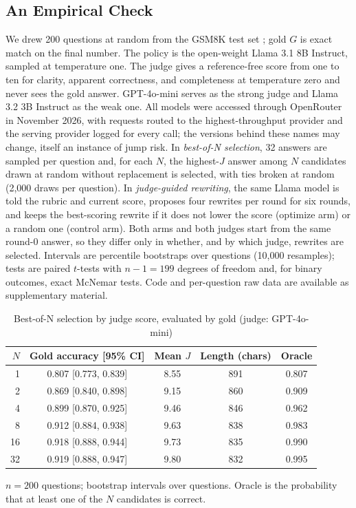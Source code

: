 \documentclass[acmsmall,screen,review,anonymous]{acmart}
\theoremstyle{acmdefinition}
\begin{document}
\subsection{An Empirical Check}

We drew 200 questions at random from the GSM8K test set \citep{cobbe2021}; gold $G$ is exact match on the final number. The policy is the open-weight Llama 3.1 8B Instruct, sampled at temperature one. The judge gives a reference-free score from one to ten for clarity, apparent correctness, and completeness at temperature zero and never sees the gold answer. GPT-4o-mini serves as the strong judge and Llama 3.2 3B Instruct as the weak one. All models were accessed through OpenRouter in November 2026, with requests routed to the highest-throughput provider and the serving provider logged for every call; the versions behind these names may change, itself an instance of jump risk. In \emph{best-of-N selection}, 32 answers are sampled per question and, for each $N$, the highest-$J$ answer among $N$ candidates drawn at random without replacement is selected, with ties broken at random (2,000 draws per question). In \emph{judge-guided rewriting}, the same Llama model is told the rubric and current score, proposes four rewrites per round for six rounds, and keeps the best-scoring rewrite if it does not lower the score (optimize arm) or a random one (control arm). Both arms and both judges start from the same round-0 answer, so they differ only in whether, and by which judge, rewrites are selected. Intervals are percentile bootstraps over questions (10,000 resamples); tests are paired $t$-tests with $n - 1 = 199$ degrees of freedom and, for binary outcomes, exact McNemar tests. Code and per-question raw data are available as supplementary material.

\begin{table}[t]
\caption{Best-of-N selection by judge score, evaluated by gold (judge: GPT-4o-mini)}\label{tab:bon}
\small
\begin{tabular}{@{}rcccc@{}}
\toprule
$N$ & Gold accuracy [95\% CI] & Mean $J$ & Length (chars) & Oracle \\
\midrule
1 & 0.807 [0.773, 0.839] & 8.55 & 891 & 0.807 \\
2 & 0.869 [0.840, 0.898] & 9.15 & 860 & 0.909 \\
4 & 0.899 [0.870, 0.925] & 9.46 & 846 & 0.962 \\
8 & 0.912 [0.884, 0.938] & 9.63 & 838 & 0.983 \\
16 & 0.918 [0.888, 0.944] & 9.73 & 835 & 0.990 \\
32 & 0.919 [0.888, 0.947] & 9.80 & 832 & 0.995 \\
\bottomrule
\end{tabular}
\par\smallskip\footnotesize $n = 200$ questions; bootstrap intervals over questions. Oracle is the probability that at least one of the $N$ candidates is correct.
\end{table}
\end{document}
